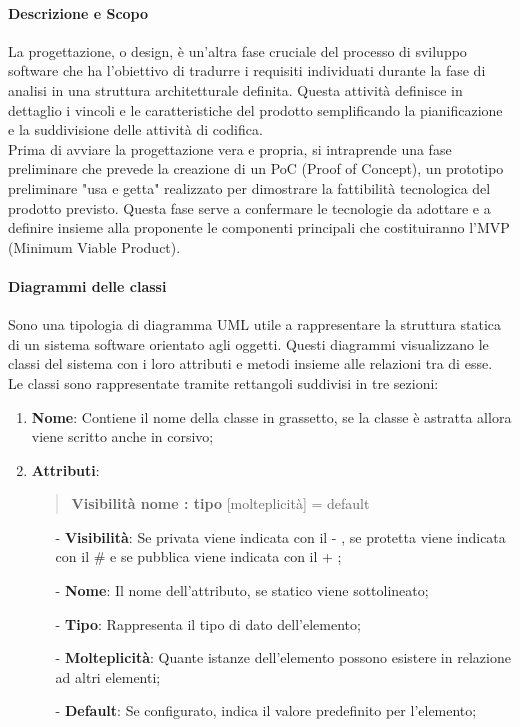 \documentclass[10pt]{article}
\begin{document}
\begin{justify}
        \paragraph{Descrizione e Scopo}
        La progettazione, o design, è un'altra fase cruciale del processo di sviluppo software che ha l'obiettivo di tradurre i requisiti individuati durante la fase di analisi in una struttura architetturale definita. Questa attività definisce in dettaglio i vincoli e le caratteristiche del prodotto semplificando la pianificazione e la suddivisione delle attività di codifica.\\
        Prima di avviare la progettazione vera e propria, si intraprende una fase preliminare che prevede la creazione di un PoC (Proof of Concept), un prototipo preliminare "usa e getta" realizzato per dimostrare la fattibilità tecnologica del prodotto previsto. Questa fase serve a confermare le tecnologie da adottare e a definire insieme alla proponente le componenti principali che costituiranno l'MVP (Minimum Viable Product).\\

        \paragraph{Diagrammi delle classi}
        Sono una tipologia di diagramma UML utile a rappresentare la struttura statica di un sistema software orientato agli oggetti. Questi diagrammi visualizzano le classi del sistema con i loro attributi e metodi insieme alle relazioni tra di esse.\\
        Le classi sono rappresentate tramite rettangoli suddivisi in tre sezioni:
        \begin{enumerate}
            \item \textbf{Nome}: Contiene il nome della classe in grassetto, se la classe è astratta allora viene scritto anche in corsivo;
            \item \textbf{Attributi}:
            \begin{quote}
                \textbf{Visibilità nome : tipo} [molteplicità] = default
            \end{quote}
            \begin{itemize}
                \item [-] \textbf{Visibilità}: Se privata viene indicata con il - , se protetta viene indicata con il \# e se pubblica viene indicata con il + ;
                \item [-] \textbf{Nome}: Il nome dell’attributo, se statico viene sottolineato;
                \item [-] \textbf{Tipo}: Rappresenta il tipo di dato dell’elemento;
                \item [-] \textbf{Molteplicità}: Quante istanze dell’elemento possono esistere in relazione ad altri elementi;
                \item [-] \textbf{Default}: Se configurato, indica il valore predefinito per l’elemento;
            \end{itemize}


\end{enumerate}
\end{justify}
\end{document}
